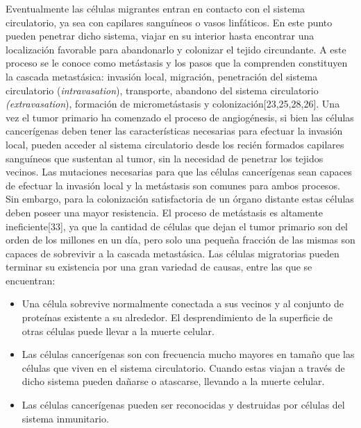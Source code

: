 \hspace{.1cm}Eventualmente las células migrantes entran en contacto con el sistema circulatorio, ya sea con capilares sanguíneos o vasos linfáticos. En este punto pueden penetrar dicho sistema, viajar en su interior hasta encontrar una localización favorable para abandonarlo y colonizar el tejido circundante. A este proceso se le conoce como metástasis y los pasos que la comprenden constituyen la cascada metastásica: invasión local, migración, penetración del sistema circulatorio (\textit{intravasation}), transporte, abandono del sistema circulatorio \textit{(extravasation}), formación de micrometástasis y colonización[23,25,28,26]. Una vez el tumor primario ha comenzado el proceso de angiogénesis, si bien las células cancerígenas deben tener las características necesarias para efectuar la invasión local, pueden acceder al sistema circulatorio desde los recién formados capilares sanguíneos que sustentan al tumor, sin la necesidad de penetrar los tejidos vecinos.
\hspace{.1cm}Las mutaciones necesarias para que las células cancerígenas sean capaces de efectuar la invasión local y la metástasis son comunes para ambos procesos. Sin embargo, para la colonización satisfactoria de un órgano distante estas células deben poseer una mayor resistencia. El proceso de metástasis es altamente ineficiente[33], ya que la cantidad de células que dejan el tumor primario son del orden de los millones en un día, pero solo una pequeña fracción de las mismas son capaces de sobrevivir a la cascada metastásica. Las células migratorias pueden terminar su existencia por una gran variedad de causas, entre las que se encuentran:
\begin{itemize}
    \item Una célula sobrevive normalmente conectada a sus vecinos y al conjunto de proteínas existente a su alrededor. El desprendimiento de la superficie de otras células puede llevar a la muerte celular.
    \item Las células cancerígenas son con frecuencia mucho mayores en tamaño que las células que viven en el sistema circulatorio. Cuando estas viajan a través de dicho sistema pueden dañarse o atascarse, llevando a la muerte celular.
    \item Las células cancerígenas pueden ser reconocidas y destruidas por células del sistema inmunitario.
\end{itemize}

